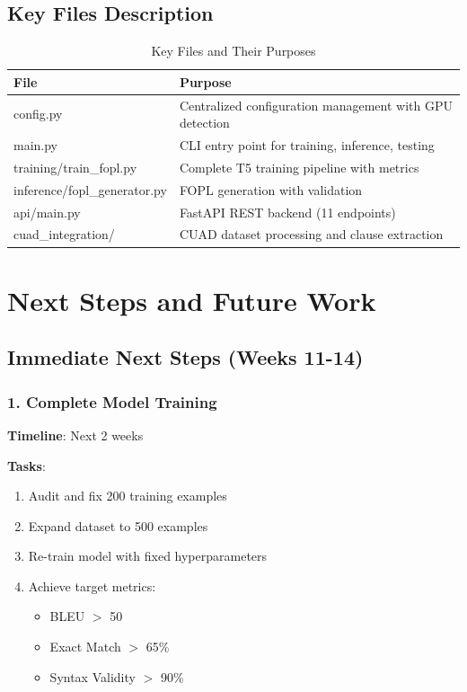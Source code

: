 \documentclass[12pt,a4paper]{article}
\begin{document}
\subsection{Key Files Description}

\begin{table}[H]
\centering
\small
\begin{tabular}{|p{4cm}|p{8cm}|}
\hline
\textbf{File} & \textbf{Purpose} \\
\hline
config.py & Centralized configuration management with GPU detection \\
\hline
main.py & CLI entry point for training, inference, testing \\
\hline
training/train\_fopl.py & Complete T5 training pipeline with metrics \\
\hline
inference/fopl\_generator.py & FOPL generation with validation \\
\hline
api/main.py & FastAPI REST backend (11 endpoints) \\
\hline
cuad\_integration/ & CUAD dataset processing and clause extraction \\
\hline
\end{tabular}
\caption{Key Files and Their Purposes}
\end{table}

\newpage

\section{Next Steps and Future Work}

\subsection{Immediate Next Steps (Weeks 11-14)}

\subsubsection{1. Complete Model Training}
\textbf{Timeline}: Next 2 weeks

\textbf{Tasks}:
\begin{enumerate}
    \item Audit and fix 200 training examples
    \item Expand dataset to 500 examples
    \item Re-train model with fixed hyperparameters
    \item Achieve target metrics:
    \begin{itemize}
        \item BLEU $>$ 50
        \item Exact Match $>$ 65\%
        \item Syntax Validity $>$ 90\%
    \end{itemize}
\end{enumerate}
\end{document}
